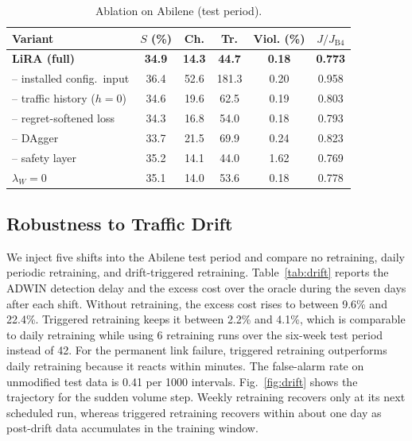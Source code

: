 \documentclass[conference]{IEEEtran}
\begin{document}
\begin{table}[t]
\centering
\caption{Ablation on Abilene (test period).}
\label{tab:ablation}
\footnotesize
\setlength{\tabcolsep}{3.5pt}
\begin{tabular}{@{}lccccc@{}}
\toprule
Variant & $S$ (\%) & Ch. & Tr. & Viol. (\%) & $J/J_{\mathrm{B4}}$ \\
\midrule
\textbf{LiRA (full)} & \textbf{34.9} & \textbf{14.3} & \textbf{44.7} & \textbf{0.18} & \textbf{0.773} \\
-- installed config.\ input & 36.4 & 52.6 & 181.3 & 0.20 & 0.958 \\
-- traffic history ($h=0$) & 34.6 & 19.6 & 62.5 & 0.19 & 0.803 \\
-- regret-softened loss & 34.3 & 16.8 & 54.0 & 0.18 & 0.793 \\
-- DAgger & 33.7 & 21.5 & 69.9 & 0.24 & 0.823 \\
-- safety layer & 35.2 & 14.1 & 44.0 & 1.62 & 0.769 \\
$\lambda_W=0$ & 35.1 & 14.0 & 53.6 & 0.18 & 0.778 \\
\bottomrule
\end{tabular}
\end{table}

\subsection{Robustness to Traffic Drift}

We inject five shifts into the Abilene test period and compare no retraining, daily periodic retraining, and drift-triggered retraining. Table~\ref{tab:drift} reports the ADWIN detection delay and the excess cost over the oracle during the seven days after each shift. Without retraining, the excess cost rises to between 9.6\% and 22.4\%. Triggered retraining keeps it between 2.2\% and 4.1\%, which is comparable to daily retraining while using 6 retraining runs over the six-week test period instead of 42. For the permanent link failure, triggered retraining outperforms daily retraining because it reacts within minutes. The false-alarm rate on unmodified test data is 0.41 per 1000 intervals. Fig.~\ref{fig:drift} shows the trajectory for the sudden volume step. Weekly retraining recovers only at its next scheduled run, whereas triggered retraining recovers within about one day as post-drift data accumulates in the training window.
\end{document}

